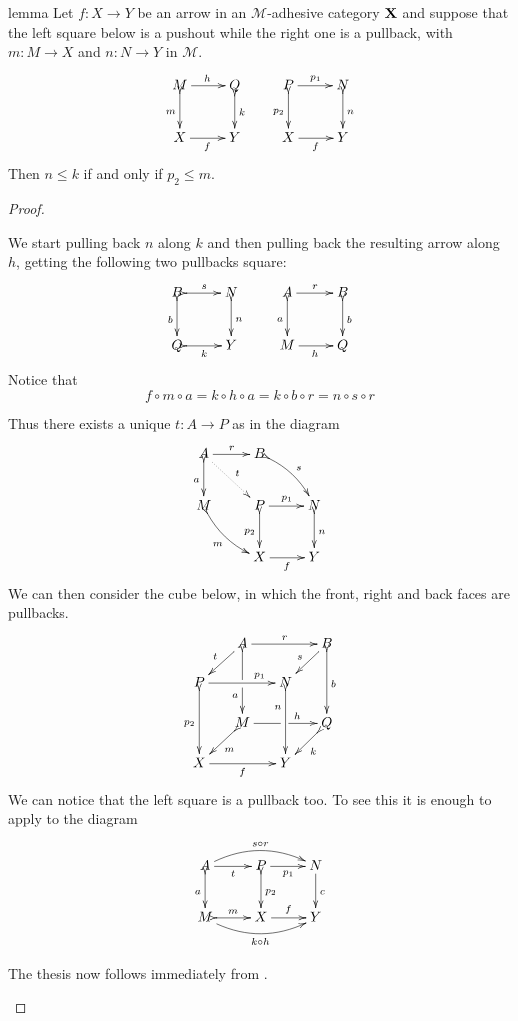 \documentclass[a4paper,UKenglish,cleveref,pdftex, thm-restate,numberwithinsect]{lipics}
\def\X{\textbf {\textup{X}}}
\begin{document}
\begin{theoremEnd}[category=sec2]{lemma}\label{lem:radj}
Let $f\colon X\to Y$ be an arrow in an $\mathcal{M}$-adhesive category $\X$ and suppose that the left square below is a pushout while the  right one is a pullback, with $ m\colon M\to X$ and $n\colon N\to Y$ in $\mathcal{M}$.
\[\xymatrix{M \ar@{>->}[d]_{m}\ar[r]^{h}& Q \ar@{>->}[d]^{k} & P \ar[r]^{p_1} \ar@{>->}[d]_{p_2}& N \ar@{>->}[d]^{n}\\X\ar[r]_{f}&Y &X \ar[r]_f&Y\\}\]
Then $n\leq k$ if and only if $p_2\leq m$.
\end{theoremEnd}
\begin{proof} 
\begin{proofEnd}  
	We start pulling back $n$ along $k$ and then pulling back the resulting arrow along $h$, getting the following two pullbacks square:
\[\xymatrix{B \ar@{>->}[d]_{b}\ar@{>->}[r]^{s}& N \ar@{>->}[d]^{n} & A \ar[r]^{r} \ar@{>->}[d]_{a}& B \ar@{>->}[d]^{b}\\Q\ar@{>->}[r]_{k}&Y &M \ar[r]_h&Q\\}\]
Notice that 
\[
f\circ m\circ a=k\circ h\circ a=k\circ b\circ r=n\circ s\circ r\]

	Thus there exists a unique $t\colon A\to P$ as in the diagram
\[\xymatrix{A \ar@{>->}[d]_{a} \ar@{.>}[dr]^{t}\ar[r]^{r} &B \ar@{>->}@/^.2cm/[dr]^{s} \\ M \ar@{>->}@/_.2cm/[dr]_{m}&P\ar[r]^{p_1}  \ar@{>->}[d]_{p_2}& N \ar@{>->}[d]^{n}\\ &X \ar[r]_{f} & Y}\]
	We can then consider the cube below, in which the front, right and back faces are pullbacks.
		\[\xymatrix@C=15pt@R=15pt{&A\ar@{>->}[dd]|\hole_(.65){a}\ar[rr]^{r} \ar[dl]_{t} && B \ar@{>->}[dd]^{b} \ar[dl]_{s} \\ P  \ar@{>->}[dd]_{p_2}\ar[rr]^(.7){p_1} & & N \ar@{>->}[dd]_(.3){n}\\&M\ar[rr]|\hole^(.65){h} \ar@{>->}[dl]^{m} && Q \ar@{>->}[dl]^{k} \\X \ar[rr]_{f} & & Y}\]
	We can notice that the left square is a pullback too. To see this it is enough to apply  to the diagram
	\[\xymatrix{A  \ar@/^.4cm/[rr]^{s\circ r}\ar@{>->}[d]_{a} \ar[r]_{t}& \ar[r]_{p_1} P \ar@{>->}[d]^{p_2}& N \ar[d]^{c}\\ M \ar@/_.4cm/[rr]_{k\circ h}\ar@{>->}[r]^{m}& X \ar[r]^{f}& Y}\]

	The thesis now follows immediately from . \qedhere 
\end{proofEnd}
\end{proof}
\end{document}
